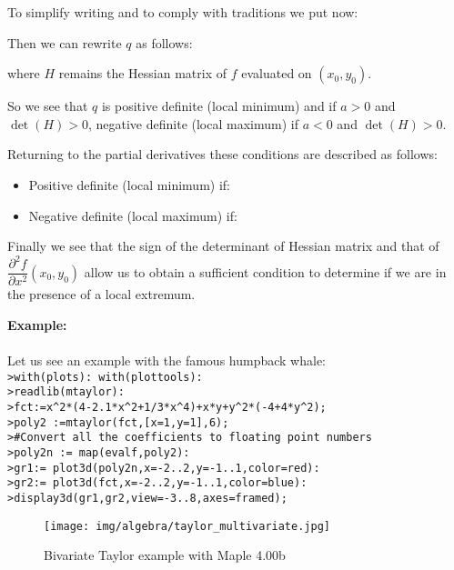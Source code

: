 	To simplify writing and to comply with traditions we put now:
	
	Then we can rewrite $q$ as follows:
	
	where $H$ remains the Hessian matrix of $f$ evaluated on $(x_0,y_0)$.
	
	So we see that $q$ is positive definite (local minimum) and if $a>0$ and $\det(H)>0$, negative definite (local maximum) if $a<0$ and $\det(H)>0$.
	
	Returning to the partial derivatives these conditions are described as follows:
	\begin{itemize}
		\item Positive definite (local minimum) if:
		
		
		\item Negative definite (local maximum) if:
		
	\end{itemize}
	Finally we see that the sign of the determinant of Hessian matrix and that of $\dfrac{\partial^2 f}{\partial x^2}(x_0,y_0)$ allow us to obtain a sufficient condition to determine if we are in the presence of a local extremum.
	
	\begin{tcolorbox}[colframe=black,colback=white,sharp corners]
	\textbf{{\Large {}}Example:}\\\\
	Let us see an example with the famous humpback whale:\\
	
	\texttt{>with(plots): with(plottools):\\
	>readlib(mtaylor):\\
	>fct:=x\string^2*(4-2.1*x\string^2+1/3*x\string^4)+x*y+y\string^2*(-4+4*y\string^2);\\
	>poly2 :=mtaylor(fct,[x=1,y=1],6);\\
	>\#Convert all the coefficients to floating point numbers\\
	>poly2n := map(evalf,poly2):\\
	>gr1:= plot3d(poly2n,x=-2..2,y=-1..1,color=red):\\
	>gr2:= plot3d(fct,x=-2..2,y=-1..1,color=blue):\\
	>display3d({gr1,gr2},view=-3..8,axes=framed);
	}
	\begin{figure}[H]
		\centering
		\texttt{[image: img/algebra/taylor\_multivariate.jpg]}
		\caption{Bivariate Taylor example with Maple 4.00b}
	\end{figure}
	\end{tcolorbox}
	
